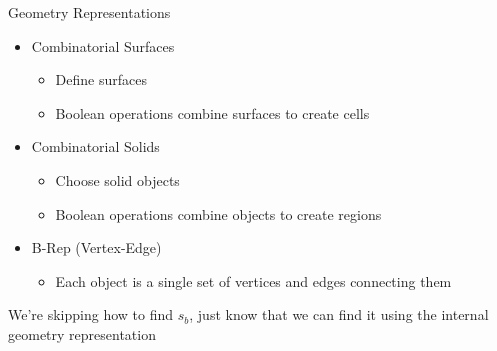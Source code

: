 \documentclass[xcolor=x11names,compress,handout]{beamer}
\renewcommand{\(}{\begin{columns}}
\renewcommand{\)}{\end{columns}}
\newcommand{\<}[1]{\begin{column}{#1}}
\renewcommand{\>}{\end{column}}
\begin{document}
\begin{frame}{Geometry Representations}

\begin{itemize}
  \item Combinatorial Surfaces
  \begin{itemize}
    \item Define surfaces
    \item Boolean operations combine surfaces to create cells
  \end{itemize}
  \vspace*{1 em}
  \item Combinatorial Solids
  \begin{itemize}
    \item Choose solid objects
    \item Boolean operations combine objects to create regions
  \end{itemize}
  \vspace*{1 em}
  \item B-Rep (Vertex-Edge)
  \begin{itemize}
    \item Each object is a single set of vertices and edges connecting them
  \end{itemize}
\end{itemize}
\vspace*{1 em}
We're skipping how to find $s_b$, just know that we can find it using the internal geometry representation

\end{frame}
\end{document}
